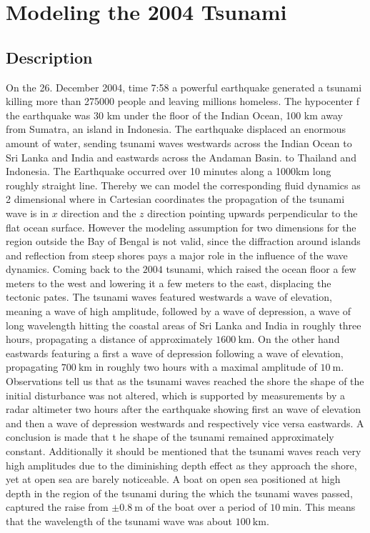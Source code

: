 \section{Modeling the 2004 Tsunami}
\subsection{Description}
On the 26. December 2004, time 7:58 a powerful earthquake generated a tsunami
killing more than 275000 people and leaving millions homeless. The
hypocenter f the earthquake was 30 km under the floor of the Indian Ocean,
100 km away from Sumatra, an island in Indonesia. The earthquake displaced
an enormous amount of water, sending tsunami waves westwards across the
Indian Ocean to Sri Lanka and India and eastwards across the Andaman Basin.
to Thailand and Indonesia. The Earthquake occurred over 10 minutes along a
1000km long roughly straight line. Thereby we can model the corresponding
fluid dynamics as 2 dimensional where in Cartesian coordinates the
propagation of the tsunami wave is in $x$ direction and the $z$ direction
pointing upwards perpendicular to the flat ocean surface. However the
modeling assumption for two dimensions for the region outside the Bay of
Bengal is not valid, since the diffraction around islands and reflection from
steep shores pays a major role in the influence of the wave dynamics. Coming
back to the $2004$ tsunami, which raised the ocean floor a few meters to the
west and lowering it a few meters to the east, displacing the tectonic pates.
The tsunami waves featured westwards a wave of elevation, meaning a wave of
high amplitude, followed by a wave of depression, a wave of long wavelength
hitting the coastal areas of Sri Lanka and India in roughly three hours,
propagating a distance of approximately $1600\ \text{km}$. On the other hand
eastwards featuring a first a wave of depression following a wave of
elevation, propagating $700\ \text{km}$ in roughly two hours with a maximal
amplitude of $10\ \text{m}$. Observations tell us that as the tsunami waves
reached the shore the shape of the initial disturbance was not altered, which
is supported by measurements by a radar altimeter two hours after the
earthquake showing first an wave of elevation and then a wave of depression
westwards and respectively vice versa eastwards. A conclusion is made that t
he shape of the tsunami remained approximately constant. Additionally it
should be mentioned that the tsunami waves reach very high amplitudes due to
the diminishing depth effect as they approach the shore, yet at open sea are
barely noticeable. A boat on open sea positioned at high depth in the region
of the tsunami during the which the tsunami waves passed, captured the raise
from $\pm 0.8\ \text{m}$ of the boat over a period of $10\ \text{min}$.
This means that the wavelength of the tsunami wave was about $100\
\text{km}$.
